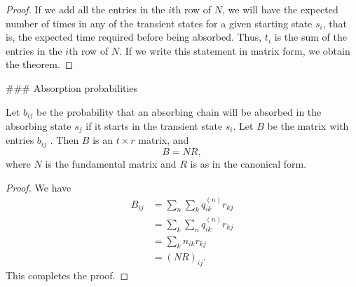 \begin{proof}
If we add all the entries in the $i$th row of $N$, we will have the expected number of times in any of the transient states for a given starting state $s_i$, that is, the expected time required before being absorbed. Thus, $t_i$ is the sum of the entries in the $i$th row of $N$. If we write this statement in matrix form, we obtain the theorem.
\end{proof}

### Absorption probabilities
\begin{theorem}
Let $b_{ij}$ be the probability that an absorbing chain will be absorbed in the absorbing state $s_j$ if it starts in the transient state $s_i$. Let $B$ be the matrix with entries $b_{ij}$ . Then $B$ is an $t\times r$ matrix, and
\begin{equation*}
    B = NR,
\end{equation*}
where $N$ is the fundamental matrix and $R$ is as in the canonical form.
\end{theorem}

\begin{proof}
We have 
\begin{equation*}
    \begin{aligned} 
        B_{i j} &=\sum_{n} \sum_{k} q_{i k}^{(n)} r_{k j} \\ &=\sum_{k} \sum_{n} q_{i k}^{(n)} r_{k j} \\ &=\sum_{k} n_{i k} r_{k j} \\ &=(N R)_{i j}.
    \end{aligned}
\end{equation*}
This completes the proof.
\end{proof}


